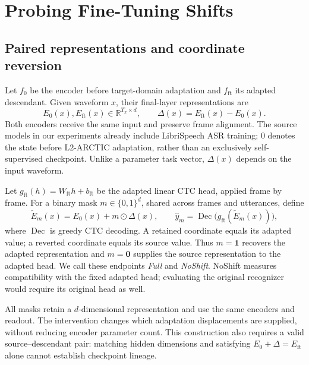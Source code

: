\documentclass{article}
\newcommand{\ft}{\mathrm{ft}}
\begin{document}
\section{Probing Fine-Tuning Shifts}
\label{sec:method}

\subsection{Paired representations and coordinate reversion}
Let $f_0$ be the encoder before target-domain adaptation and $f_{\ft}$ its adapted descendant. Given waveform $x$, their final-layer representations are
\begin{equation}
 E_0(x),E_{\ft}(x)\in\mathbb{R}^{T_x\times d},\qquad
 \Delta(x)=E_{\ft}(x)-E_0(x).
 \label{eq:shift}
\end{equation}
Both encoders receive the same input and preserve frame alignment. The source models in our experiments already include LibriSpeech ASR training; $0$ denotes the state before L2-ARCTIC adaptation, rather than an exclusively self-supervised checkpoint. Unlike a parameter task vector, $\Delta(x)$ depends on the input waveform.

Let $g_{\ft}(h)=W_{\ft}h+b_{\ft}$ be the adapted linear CTC head, applied frame by frame. For a binary mask $m\in\{0,1\}^{d}$, shared across frames and utterances, define
\begin{equation}
 \widetilde E_m(x)=E_0(x)+m\odot\Delta(x),
 \qquad
 \hat y_m=\operatorname{Dec}\bigl(g_{\ft}(\widetilde E_m(x))\bigr),
 \label{eq:mask}
\end{equation}
where $\operatorname{Dec}$ is greedy CTC decoding. A retained coordinate equals its adapted value; a reverted coordinate equals its source value. Thus $m=\mathbf{1}$ recovers the adapted representation and $m=\mathbf{0}$ supplies the source representation to the adapted head. We call these endpoints \emph{Full} and \emph{NoShift}. NoShift measures compatibility with the fixed adapted head; evaluating the original recognizer would require its original head as well.

All masks retain a $d$-dimensional representation and use the same encoders and readout. The intervention changes which adaptation displacements are supplied, without reducing encoder parameter count. This construction also requires a valid source--descendant pair: matching hidden dimensions and satisfying $E_0+\Delta=E_{\ft}$ alone cannot establish checkpoint lineage.
\end{document}
